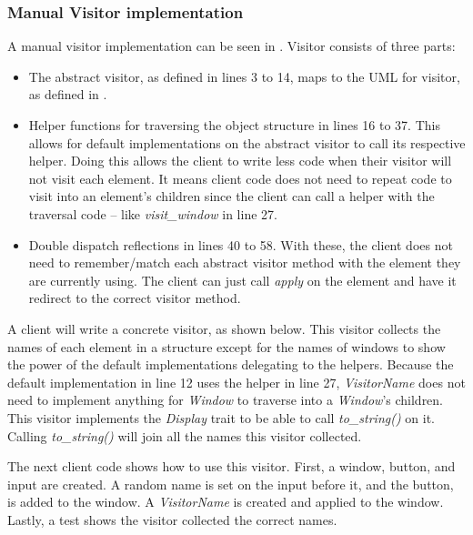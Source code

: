 \subsubsection{Manual Visitor implementation}
\label{sec:visitor-manual-implementation}
A manual visitor implementation can be seen in .
Visitor consists of three parts:
\begin{itemize}
	\item The abstract visitor, as defined in lines 3 to 14, maps to the UML for visitor, as defined in .
	\item Helper functions for traversing the object structure \cite{gamma_94_01} in lines 16 to 37.
	      This allows for default implementations on the abstract visitor to call its respective helper.
	      Doing this allows the client to write less code when their visitor will not visit each element.
	      It means client code does not need to repeat code to visit into an element's children since the client can call a helper with the traversal code -- like \textit{visit\_window} in line 27.
	\item Double dispatch reflections in lines 40 to 58.
	      With these, the client does not need to remember/match each abstract visitor method with the element they are currently using.
	      The client can just call \textit{apply} on the element and have it redirect to the correct visitor method.
\end{itemize}

A client will write a concrete visitor, as shown below.
This visitor collects the names of each element in a structure except for the names of windows to show the power of the default implementations delegating to the helpers.
Because the default implementation in  line 12 uses the helper in line 27, \textit{VisitorName} does not need to implement anything for \textit{Window} to traverse into a \textit{Window}'s children.
This visitor implements the \textit{Display} trait to be able to call \textit{to\_string()} on it.
Calling \textit{to\_string()} will join all the names this visitor collected.


The next client code shows how to use this visitor.
First, a window, button, and input are created.
A random name is set on the input before it, and the button, is added to the window.
A \textit{VisitorName} is created and applied to the window.
Lastly, a test shows the visitor collected the correct names.

